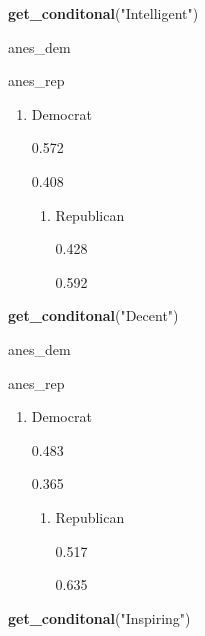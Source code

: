 \documentclass[
]{article}
\newenvironment{Shaded}{\begin{snugshade}}{\end{snugshade}}
\newcommand{\KeywordTok}[1]{\textcolor[rgb]{0.13,0.29,0.53}{\textbf{#1}}}
\newcommand{\NormalTok}[1]{#1}
\newcommand{\StringTok}[1]{\textcolor[rgb]{0.31,0.60,0.02}{#1}}
\providecommand{\tightlist}{%
  \setlength{\itemsep}{0pt}\setlength{\parskip}{0pt}}
\begin{document}
\begin{Shaded}
\begin{Highlighting}[]
\KeywordTok{get_conditonal}\NormalTok{(}\StringTok{"Intelligent"}\NormalTok{)}
\end{Highlighting}
\end{Shaded}

anes\_dem

anes\_rep

\begin{enumerate}
\def\labelenumi{\arabic{enumi}.}
\tightlist
\item
  Democrat

  {0.572}

  {0.408}

  \begin{enumerate}
  \def\labelenumii{\arabic{enumii}.}
  \setcounter{enumii}{1}
  \tightlist
  \item
    Republican

    {0.428}

    {0.592}
  \end{enumerate}
\end{enumerate}

\begin{Shaded}
\begin{Highlighting}[]
\KeywordTok{get_conditonal}\NormalTok{(}\StringTok{"Decent"}\NormalTok{)}
\end{Highlighting}
\end{Shaded}

anes\_dem

anes\_rep

\begin{enumerate}
\def\labelenumi{\arabic{enumi}.}
\tightlist
\item
  Democrat

  {0.483}

  {0.365}

  \begin{enumerate}
  \def\labelenumii{\arabic{enumii}.}
  \setcounter{enumii}{1}
  \tightlist
  \item
    Republican

    {0.517}

    {0.635}
  \end{enumerate}
\end{enumerate}

\begin{Shaded}
\begin{Highlighting}[]
\KeywordTok{get_conditonal}\NormalTok{(}\StringTok{"Inspiring"}\NormalTok{)}
\end{Highlighting}
\end{Shaded}
\end{document}
